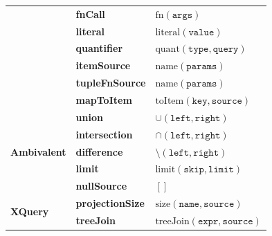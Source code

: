 \begin{table}[htp!]
\begin{tabular}{
lll
    }
& \textbf{fnCall}             & $\text{fn}(\texttt{args})$ \\
& \textbf{literal}            & $\text{literal}(\texttt{value})$ \\
& \textbf{quantifier}         & $\text{quant}(\texttt{type}, \texttt{query})$ \\
& \textbf{itemSource}         & $\text{name}(\texttt{params})$ \\
& \textbf{tupleFnSource}	    & $\text{name}(\texttt{params})$ \\
& \textbf{mapToItem}	        & $\text{toItem}(\texttt{key},\texttt{source})$ \\
\midrule
\multirow{5}{*}{\textbf{Ambivalent}}
& \textbf{union}
& $\cup(\texttt{left}, \texttt{right})$ \\
& \textbf{intersection}       & $\cap(\texttt{left}, \texttt{right})$ \\
& \textbf{difference}         & $\setminus(\texttt{left}, \texttt{right})$ \\
& \textbf{limit}	            & $\text{limit}(\texttt{skip},\texttt{limit})$ \\
& \textbf{nullSource}	        & $[]$\\
\midrule
\multirow{2}{*}{\textbf{XQuery}}
& \textbf{projectionSize}     & $\text{size}(\texttt{name}, \texttt{source})$  \\
& \textbf{treeJoin}           & $\text{treeJoin}(\texttt{expr}, \texttt{source})$  \\
\bottomrule
\end{tabular}
\end{table}


